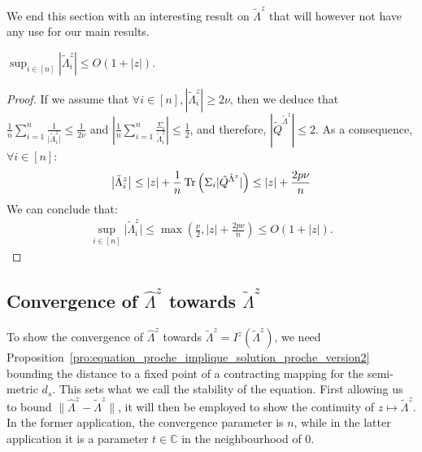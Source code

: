 \documentclass[a4papaer, titlepage]{book}
\begin{document}
We end this section with an interesting result on $\tilde \Lambda^z$ that will however not have any use for our main results.
\begin{lemma}\label{lem:Lambda^z_tilde_borne}
  $\sup_{i\in [n]} |\tilde \Lambda^z_i | \leq O(1+|z|)$.
\end{lemma}
\begin{proof}%
  If we assume that $\forall i\in [n], |\tilde \Lambda^z_i | \geq 2\nu $, then we deduce that $\frac{1}{n}\sum_{i= 1}^n \frac{1}{\vert\tilde\Lambda^z_i\vert} \leq \frac{1}{2\nu}$ and 
  $|\frac{1}{n}\sum_{i= 1}^n \frac{\Sigma_i}{\tilde\Lambda^z_i}| \leq \frac{1}{2}$, and therefore, $|\tilde Q^{\tilde \Lambda^z}| \leq 2$. As a consequence, $\forall i \in [n]$:
  \begin{align*}
    \left\vert \tilde \Lambda^z_i\right\vert \leq \left\vert z\right\vert + \frac{1}{n} \operatorname{Tr} \left(\Sigma_i |\tilde Q^{\tilde \Lambda^z}|\right) \leq |z| + \frac{2p\nu}{n} 
  \end{align*}
  We can conclude that:
  \begin{align*}
    \sup_{i\in [n]} \vert\tilde\Lambda^z_i\vert \leq \max \left(\frac{\nu}{2},|z| + \frac{2p\nu}{n} \right) \leq O(1 + | z|). 
  \end{align*}
\end{proof}





\subsection{Convergence of $\hat \Lambda^z$ towards $\tilde \Lambda^z$}
To show the convergence of $\hat \Lambda^z$ towards $\tilde \Lambda^z = I^z(\tilde \Lambda^z)$, we need Proposition~\ref{pro:equation_proche_implique_solution_proche_version2} bounding the distance to a fixed point of a contracting mapping for the semi-metric $d_s$. This sets what we call the stability of the equation. First allowing us to bound $\| \hat \Lambda^z -\tilde \Lambda^z\|$, it will then be employed to show the continuity of $z \mapsto \tilde \Lambda^z$. 
  In the former application, the convergence parameter is $n$, while in the latter application it is a parameter $t \in \mathbb C$ in the neighbourhood of $0$. 
\end{document}
